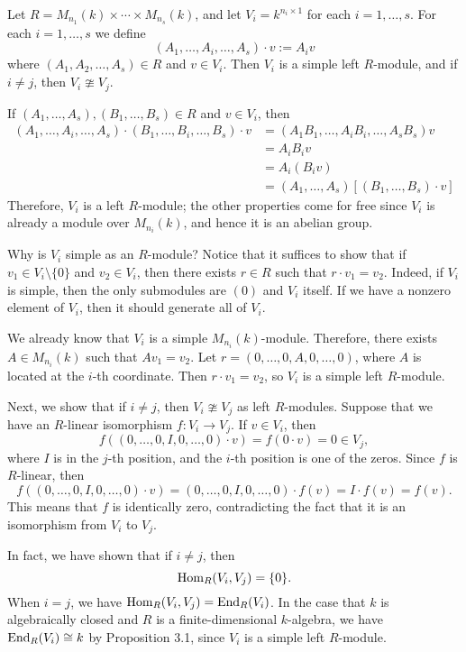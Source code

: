 \begin{lemma}{}
    Let $R = M_{n_1}(k) \times \cdots \times M_{n_s}(k)$, and let 
    $V_i = k^{n_i \times 1}$ for each $i = 1, \dots, s$. For each 
    $i = 1, \dots, s$ we define 
    \[ (A_1, \dots, A_i, \dots, A_s) \cdot v := A_i v \] 
    where $(A_1, A_2, \dots, A_s) \in R$ and $v \in V_i$. 
    Then $V_i$ is a simple left $R$-module, and if $i \neq j$, then 
    $V_i \ncong V_j$. 
\end{lemma}
\begin{pf}
    If $(A_1, \dots, A_s), (B_1, \dots, B_s) \in R$ and $v \in V_i$, then 
    \begin{align*} 
        (A_1, \dots, A_i, \dots, A_s) \cdot (B_1, \dots, B_i, \dots, B_s) \cdot v 
        &= (A_1B_1, \dots, A_iB_i, \dots, A_sB_s) v \\ 
        &= A_iB_i v \\ 
        &= A_i(B_i v) \\ 
        &= (A_1, \dots, A_s) [(B_1, \dots, B_s) \cdot v] 
    \end{align*} 
    Therefore, $V_i$ is a left $R$-module; the other properties come for free 
    since $V_i$ is already a module over $M_{n_i}(k)$, and hence it is an abelian 
    group. 

    Why is $V_i$ simple as an $R$-module? Notice that it suffices to show that 
    if $v_1 \in V_i \setminus \{0\}$ and $v_2 \in V_i$, then there exists 
    $r \in R$ such that $r \cdot v_1 = v_2$. Indeed, if $V_i$ is simple, then 
    the only submodules are $(0)$ and $V_i$ itself. If we have a nonzero 
    element of $V_i$, then it should generate all of $V_i$. 

    We already know that $V_i$ is a simple $M_{n_i}(k)$-module. Therefore, 
    there exists $A \in M_{n_i}(k)$ such that $Av_1 = v_2$. Let 
    $r = (0, \dots, 0, A, 0, \dots, 0)$, where $A$ is located at the 
    $i$-th coordinate. Then $r \cdot v_1 = v_2$, so $V_i$ is a simple 
    left $R$-module. 

    Next, we show that if $i \neq j$, then $V_i \ncong V_j$ as left $R$-modules. 
    Suppose that we have an $R$-linear isomorphism $f : V_i \to V_j$. 
    If $v \in V_i$, then 
    \[ f((0, \dots, 0, I, 0, \dots, 0) \cdot v) = f(0 \cdot v) = 0 \in V_j, \] 
    where $I$ is in the $j$-th position, and the $i$-th position is one of the 
    zeros. Since $f$ is $R$-linear, then 
    \[ f((0, \dots, 0, I, 0, \dots, 0) \cdot v) = (0, \dots, 0, I, 0, \dots, 0)
    \cdot f(v) = I \cdot f(v) = f(v). \] 
    This means that $f$ is identically zero, contradicting the fact that 
    it is an isomorphism from $V_i$ to $V_j$. 
\end{pf}

\begin{remark}{}
    In fact, we have shown that if $i \neq j$, then 
    \[ \operatorname{Hom}_R(V_i, V_j) = \{0\}. \] 
    When $i = j$, we have $\operatorname{Hom}_R(V_i, V_j) = \operatorname{End}_R(V_i)$. In the case that 
    $k$ is algebraically closed and $R$ is a finite-dimensional $k$-algebra, 
    we have $\operatorname{End}_R(V_i) \cong k$ by Proposition 3.1, since $V_i$ is a simple 
    left $R$-module. 
\end{remark}